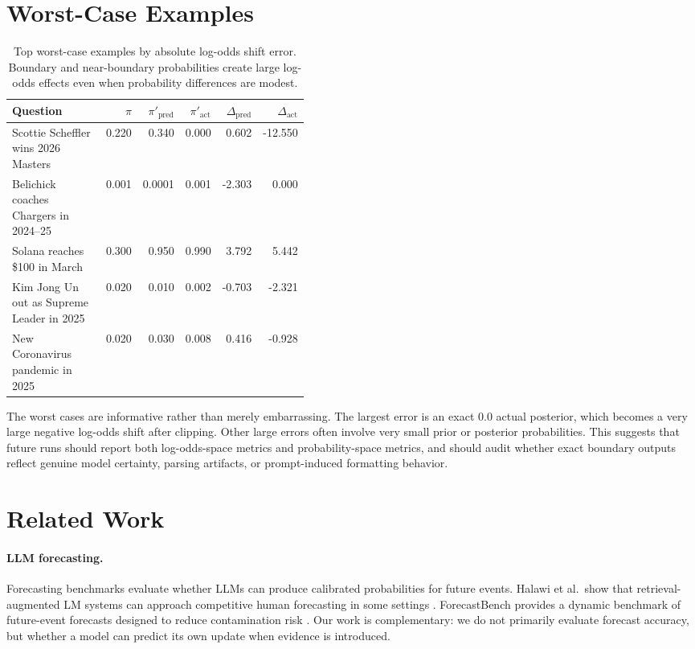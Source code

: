 \documentclass[11pt]{article}
\newcommand{\pred}{\mathrm{pred}}
\newcommand{\act}{\mathrm{act}}
\begin{document}
\section{Worst-Case Examples}

\begin{table}[t]
\centering
\scriptsize
\begin{tabular}{p{0.43\linewidth}rrrrr}
\toprule
Question & $\pi$ & $\pi'_{\pred}$ & $\pi'_{\act}$ & $\Delta_{\pred}$ & $\Delta_{\act}$ \\
\midrule
Scottie Scheffler wins 2026 Masters & 0.220 & 0.340 & 0.000 & 0.602 & -12.550 \\
Belichick coaches Chargers in 2024--25 & 0.001 & 0.0001 & 0.001 & -2.303 & 0.000 \\
Solana reaches \$100 in March & 0.300 & 0.950 & 0.990 & 3.792 & 5.442 \\
Kim Jong Un out as Supreme Leader in 2025 & 0.020 & 0.010 & 0.002 & -0.703 & -2.321 \\
New Coronavirus pandemic in 2025 & 0.020 & 0.030 & 0.008 & 0.416 & -0.928 \\
\bottomrule
\end{tabular}
\caption{Top worst-case examples by absolute log-odds shift error. Boundary and
near-boundary probabilities create large log-odds effects even when probability
differences are modest.}
\label{tab:worst}
\end{table}

The worst cases are informative rather than merely embarrassing. The largest
error is an exact $0.0$ actual posterior, which becomes a very large negative
log-odds shift after clipping. Other large errors often involve very small
prior or posterior probabilities. This suggests that future runs should report
both log-odds-space metrics and probability-space metrics, and should audit
whether exact boundary outputs reflect genuine model certainty, parsing
artifacts, or prompt-induced formatting behavior.

\section{Related Work}

\paragraph{LLM forecasting.}
Forecasting benchmarks evaluate whether LLMs can produce calibrated
probabilities for future events. Halawi et al.\ show that retrieval-augmented
LM systems can approach competitive human forecasting in some settings
\cite{halawi2024forecasting}. ForecastBench provides a dynamic benchmark of
future-event forecasts designed to reduce contamination risk
\cite{karger2024forecastbench}. Our work is complementary: we do not primarily
evaluate forecast accuracy, but whether a model can predict its own update when
evidence is introduced.
\end{document}
